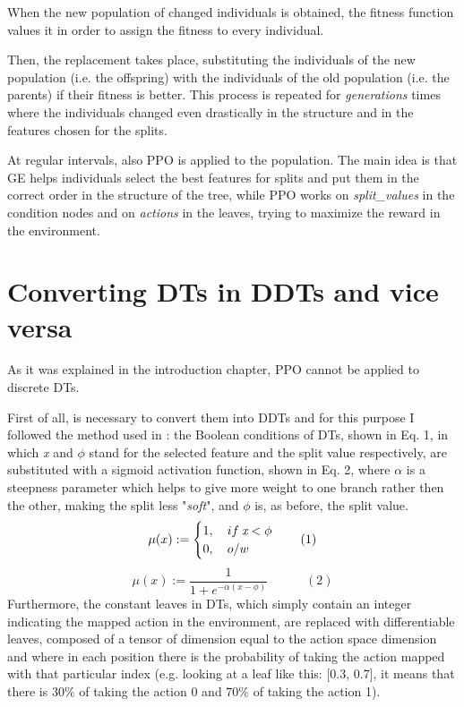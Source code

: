When the new population of changed individuals is obtained, the fitness function values it in order to assign the fitness to every individual.

Then, the replacement takes place, substituting the individuals of the new population (i.e. the offspring) with the individuals of the old population (i.e. the parents) if their fitness is better. This process is repeated for \textit{generations} times where the individuals changed even drastically in the structure and in the features chosen for the splits.

At regular intervals, also PPO is applied to the population. The main idea is that GE helps individuals select the best features for splits and put them in the correct order in the structure of the tree, while PPO works on \textit{split\_values} in the condition nodes and on \textit{actions} in the leaves, trying to maximize the reward in the environment.


\section{Converting DTs in DDTs and vice versa}
\label{sec:220}
As it was explained in the introduction chapter, PPO cannot be applied to discrete DTs.

First of all, is necessary to convert them into DDTs and for this purpose I followed the method used in \cite{silva}: the Boolean conditions of DTs, shown in Eq. 1, in which \textit{x} and \(\phi\) stand for the selected feature and the split value respectively, are substituted with a sigmoid activation function, shown in Eq. 2, where \(\alpha\) is a steepness parameter which helps to give more weight to one branch rather then the other, making the split less "\textit{soft}", and \(\phi\) is, as before, the split value.
\[\mu(x) :=
\begin{cases}
1,\quad if $\>$ \textit{x} < \phi\\
0,\quad o/w
\end{cases}
\quad(1)
\]
\[\mu(x) := \frac{1}{1+e^{-\alpha(x-\phi)}}\qquad\quad(2)\]
Furthermore, the constant leaves in DTs, which simply contain an integer indicating the mapped action in the environment, are replaced with differentiable leaves, composed of a tensor of dimension equal to the action space dimension and where in each position there is the probability of taking the action mapped with that particular index (e.g. looking at a leaf like this: [0.3, 0.7], it means that there is 30\(\%\) of taking the action 0 and 70\(\%\) of taking the action 1).

